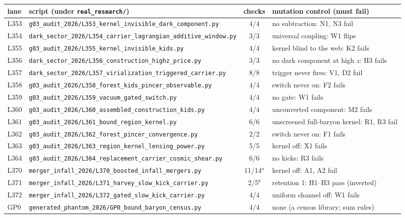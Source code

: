 \documentclass[10pt]{article}
\newcommand{\fpath}[1]{\nolinkurl{#1}}
\begin{document}
\smallskip
{\footnotesize
\begin{longtable}{@{}l>{\raggedright\arraybackslash}p{}c>{\raggedright\arraybackslash}p{}@{}}
\toprule
lane & script (under \texttt{real\_research/}) & checks & mutation control (must fail)\\
\midrule
\endhead
L353 & \fpath{g03_audit_2026/L353_kernel_invisible_dark_component.py} & 4/4 & no subtraction: N1, N3 fail\\
L354 & \fpath{dark_sector_2026/L354_carrier_lagrangian_additive_window.py} & 3/3 & universal coupling: W1 flips\\
L355 & \fpath{g03_audit_2026/L355_kernel_invisible_kids.py} & 4/4 & kernel blind to the web: K2 fails\\
L356 & \fpath{dark_sector_2026/L356_construction_highz_price.py} & 3/3 & no dark component at high $z$: H3 fails\\
L357 & \fpath{dark_sector_2026/L357_virialization_triggered_carrier.py} & 8/8 & trigger never fires: V1, D2 fail\\
L358 & \fpath{g03_audit_2026/L358_forest_kids_pincer_observable.py} & 4/4 & switch never on: F2 fails\\
L359 & \fpath{g03_audit_2026/L359_vacuum_gated_switch.py} & 4/4 & no gate: W1 fails\\
L360 & \fpath{g03_audit_2026/L360_assembled_construction_kids.py} & 4/4 & unconverted component: M2 fails\\
L361 & \fpath{g03_audit_2026/L361_bound_region_kernel.py} & 6/6 & unscreened full-baryon kernel: R1, R3 fail\\
L362 & \fpath{g03_audit_2026/L362_forest_pincer_convergence.py} & 2/2 & switch never on: F1 fails\\
L363 & \fpath{g03_audit_2026/L363_region_kernel_lensing_power.py} & 5/5 & kernel off: X1 fails\\
L364 & \fpath{g03_audit_2026/L364_replacement_carrier_cosmic_shear.py} & 6/6 & no kicks: R3 fails\\
L370 & \fpath{merger_infall_2026/L370_boosted_infall_mergers.py} & 11/14$^a$ & kernel off: A1, A2 fail\\
L371 & \fpath{merger_infall_2026/L371_harvey_slow_kick_carrier.py} & 2/5$^b$ & retention 1: H1--H3 pass (inverted)\\
L372 & \fpath{merger_infall_2026/L372_gated_slow_kick_carrier.py} & 4/4 & uniform channel off: W1 fails\\
GP0 & \fpath{generated_phantom_2026/GP0_bound_baryon_census.py} & 4/4 & none (a census library; sum rules)\\

\end{longtable}}
\end{document}

